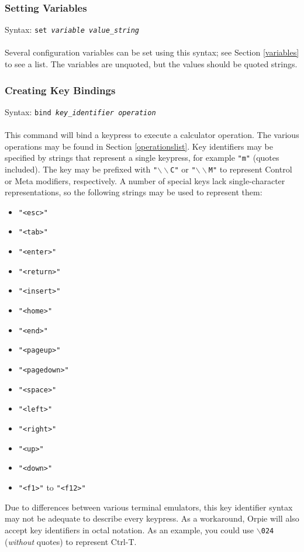 \documentclass[11pt,notitlepage]{article}
\begin{document}
\subsubsection{Setting Variables}
\label{setvar}
Syntax: {\tt set {\em variable} {\em value\_string}} \\ \\
Several configuration variables can be set using this syntax; see Section \ref{variables}
to see a list.  The variables are unquoted, but the values should be quoted strings.

\subsubsection{Creating Key Bindings}
\label{bindings}
Syntax: {\tt bind {\em key\_identifier operation}} \\ \\
This command will bind a keypress to execute a calculator operation.  The various operations
may be found in Section \ref{operationslist}. Key identifiers may be specified
by strings that represent a single keypress, for example {\tt "m"} (quotes
included).  The key may be prefixed with {\tt "$\backslash\backslash$C"} or
{\tt "$\backslash\backslash$M"} to represent Control or Meta modifiers,
respectively.  A number of special keys lack single-character representations,
so the following strings may be used to represent them:
\begin{itemize}
   \item {\tt "<esc>"}
   \item {\tt "<tab>"}
   \item {\tt "<enter>"}
   \item {\tt "<return>"}
   \item {\tt "<insert>"}
   \item {\tt "<home>"}
   \item {\tt "<end>"}
   \item {\tt "<pageup>"}
   \item {\tt "<pagedown>"}
   \item {\tt "<space>"}
   \item {\tt "<left>"}
   \item {\tt "<right>"}
   \item {\tt "<up>"}
   \item {\tt "<down>"}
   \item {\tt "<f1>"} to {\tt "<f12>"}
\end{itemize}
Due to differences between various terminal emulators, this key identifier syntax may
not be adequate to describe every keypress.  As a workaround, Orpie will also accept key
identifiers in octal notation.  As an example, you could use {\tt $\backslash$024} 
({\em without} quotes) to represent Ctrl-T.
\end{document}
